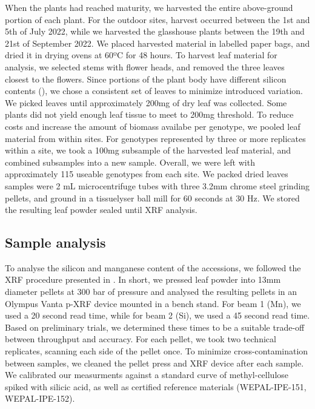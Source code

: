 \documentclass[12pt, letterpaper, ]{report}
\begin{document}
When the plants had reached maturity, we harvested the entire above-ground portion of each plant. For the outdoor sites, harvest occurred between the 1st and 5th of July 2022, while we harvested the glasshouse plants between the 19th and 21st of September 2022. We placed harvested material in labelled paper bags, and dried it in drying ovens at 60ºC for 48 hours. To harvest leaf material for analysis, we selected stems with flower heads, and removed the three leaves closest to the flowers. Since portions of the plant body have different silicon contents (\cite{dai_genetic_2005}), we chose a consistent set of leaves to minimize introduced variation. We picked leaves until approximately 200mg of dry leaf was collected. Some plants did not yield enough leaf tissue to meet to 200mg threshold. To reduce costs and increase the amount of biomass availabe per genotype, we pooled leaf material from within sites. For genotypes represented by three or more replicates within a site, we took a 100mg subsample of the harvested leaf material, and combined subsamples into a new sample. Overall, we were left with approximately 115 useable genotypes from each site. We packed dried leaves samples were 2 mL microcentrifuge tubes with three 3.2mm chrome steel grinding pellets, and ground in a tissuelyser ball mill for 60 seconds at 30 Hz. We stored the resulting leaf powder sealed until XRF analysis.  

\subsection{Sample analysis}

To analyse the silicon and manganese content of the accessions, we followed the XRF procedure presented in \textcite{reidinger_rapid_2012}. In short, we pressed leaf powder into 13mm diameter pellets at 300 bar of pressure and analysed the resulting pellets in an Olympus Vanta p-XRF device mounted in a bench stand. For beam 1 (Mn), we used a 20 second read time, while for beam 2 (Si), we used a 45 second read time. Based on preliminary trials, we determined these times to be a suitable trade-off between throughput and accuracy. For each pellet, we took two technical replicates, scanning each side of the pellet once. To minimize cross-contamination between samples, we cleaned the pellet press and XRF device after each sample. We calibrated our measurments against a standard curve of methyl-cellulose spiked with silicic acid, as well as certified reference materials (WEPAL-IPE-151, WEPAL-IPE-152).
\end{document}
